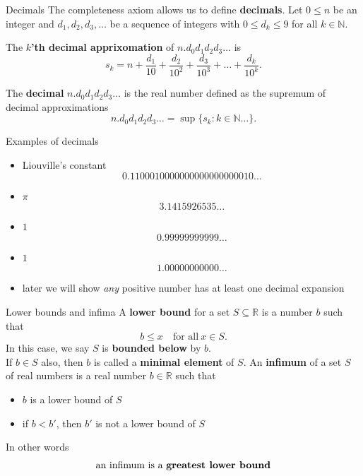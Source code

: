 \documentclass{beamer}
\begin{document}
\begin{frame}{Decimals}
The completeness axiom allows us to define \textbf{decimals}.
\pause
Let $0\leq n$ be an integer and $d_1,d_2,d_3,\dots$ be a sequence of integers with $0\leq d_k\leq 9$ for all $k\in\mathbb{N}$.  
\pause
\begin{defn}
The \textbf{$k$'th decimal apprixomation} of $n.d_0d_1d_2d_3\dots$ is
$$s_k = n+\frac{d_1}{10} + \frac{d_2}{10^2} + \frac{d_3}{10^3} + \dots + \frac{d_k}{10^k}.$$
\end{defn}
\pause
\begin{defn}
The \textbf{decimal} $n.d_0d_1d_2d_3\dots$ is the real number defined as the supremum of decimal approximations
$$n.d_0d_1d_2d_3\dots = \sup\{ s_k: k\in\mathbb N\dots\}.$$
\end{defn}
\end{frame}

\begin{frame}{Examples of decimals}
\begin{itemize}
\item Liouville's constant
$$0.1100010000000000000000010\dots$$
\pause
\item $\pi$
$$3.1415926535\dots$$
\pause
\item $1$
$$0.99999999999\dots$$
\pause
\item $1$
$$1.00000000000\dots$$
\pause
\item later we will show \emph{any} positive number has at least one decimal expansion
\end{itemize}
\end{frame}

\begin{frame}{Lower bounds and infima}
A \textbf{lower bound} for a set $S\subseteq\mathbb{R}$ is a number $b$ such that
$$b \leq x\quad\text{for all}\ x\in S.$$
\pause
In this case, we say $S$ is \textbf{bounded below} by $b$.\\
\pause
If $b\in S$ also, then $b$ is called a \textbf{minimal element} of $S$.
\pause
An \textbf{infimum} of a set $S$ of real numbers is a real number $b\in\mathbb{R}$ such that
\begin{itemize}
\item $b$ is a lower bound of $S$
\item if $b<b'$, then $b'$ is not a lower bound of $S$
\end{itemize}
\pause
In other words
$$\text{an infimum is a \bf{greatest lower bound}}$$
\end{frame}
\end{document}
